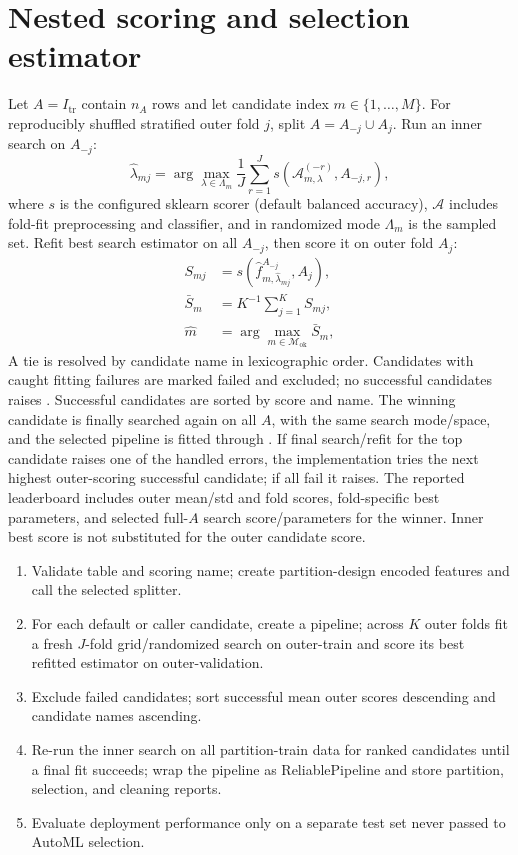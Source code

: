 ﻿\documentclass[conference]{IEEEtran}
\begin{document}
\section{Nested scoring and selection estimator}
Let \(A=I_{\mathrm{tr}}\) contain \(n_A\) rows and let candidate index \(m\in\{1,\ldots,M\}\). For reproducibly shuffled stratified outer fold \(j\), split \(A=A_{-j}\cup A_j\). Run an inner search on \(A_{-j}\):
\[
\hat\lambda_{mj}=\arg\max_{\lambda\in\Lambda_m}\frac1J\sum_{r=1}^J s\left(\mathcal A_{m,\lambda}^{(-r)}, A_{-j,r}\right),
\]
where \(s\) is the configured sklearn scorer (default balanced accuracy), \(\mathcal A\) includes fold-fit preprocessing and classifier, and in randomized mode \(\Lambda_m\) is the sampled set. Refit best search estimator on all \(A_{-j}\), then score it on outer fold \(A_j\):
\[
\begin{aligned}
S_{mj}&=s(\hat f_{m,\hat\lambda_{mj}}^{A_{-j}},A_j),\\
\bar S_m&=K^{-1}\sum_{j=1}^K S_{mj},\\
\hat m&=\arg\max_{m\in\mathcal M_{\mathrm{ok}}}\bar S_m,
\end{aligned}
\]
A tie is resolved by candidate name in lexicographic order. Candidates with caught fitting failures are marked failed and excluded; no successful candidates raises . Successful candidates are sorted by score and name. The winning candidate is finally searched again on all \(A\), with the same search mode/space, and the selected pipeline is fitted through . If final search/refit for the top candidate raises one of the handled errors, the implementation tries the next highest outer-scoring successful candidate; if all fail it raises. The reported leaderboard includes outer mean/std and fold scores, fold-specific best parameters, and selected full-\(A\) search score/parameters for the winner. Inner best score is not substituted for the outer candidate score.

\begin{enumerate}[label=\textbf{R\arabic*.},leftmargin=*]
\item Validate table and scoring name; create partition-design encoded features and call the selected splitter.
\item For each default or caller candidate, create a pipeline; across \(K\) outer folds fit a fresh \(J\)-fold grid/randomized search on outer-train and score its best refitted estimator on outer-validation.
\item Exclude failed candidates; sort successful mean outer scores descending and candidate names ascending.
\item Re-run the inner search on all partition-train data for ranked candidates until a final fit succeeds; wrap the pipeline as ReliablePipeline and store partition, selection, and cleaning reports.
\item Evaluate deployment performance only on a separate test set never passed to AutoML selection.
\end{enumerate}
\end{document}

